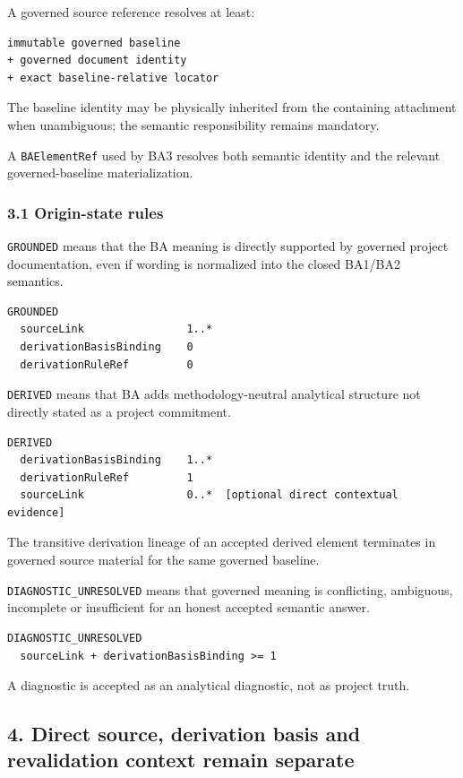 \documentclass[11pt,a4paper]{article}
\begin{document}
A governed source reference resolves at least:

\begin{verbatim}
immutable governed baseline
+ governed document identity
+ exact baseline-relative locator
\end{verbatim}

The baseline identity may be physically inherited from the containing attachment when unambiguous; the semantic responsibility remains mandatory.

A \texttt{BAElementRef} used by BA3 resolves both semantic identity and the relevant governed-baseline materialization.

\subsubsection{3.1 Origin-state rules}\label{origin-state-rules}

\texttt{GROUNDED} means that the BA meaning is directly supported by governed project documentation, even if wording is normalized into the closed BA1/BA2 semantics.

\begin{verbatim}
GROUNDED
  sourceLink                1..*
  derivationBasisBinding    0
  derivationRuleRef         0
\end{verbatim}

\texttt{DERIVED} means that BA adds methodology-neutral analytical structure not directly stated as a project commitment.

\begin{verbatim}
DERIVED
  derivationBasisBinding    1..*
  derivationRuleRef         1
  sourceLink                0..*  [optional direct contextual evidence]
\end{verbatim}

The transitive derivation lineage of an accepted derived element terminates in governed source material for the same governed baseline.

\texttt{DIAGNOSTIC\_UNRESOLVED} means that governed meaning is conflicting, ambiguous, incomplete or insufficient for an honest accepted semantic answer.

\begin{verbatim}
DIAGNOSTIC_UNRESOLVED
  sourceLink + derivationBasisBinding >= 1
\end{verbatim}

A diagnostic is accepted as an analytical diagnostic, not as project truth.

\subsection{4. Direct source, derivation basis and revalidation context remain separate}\label{direct-source-derivation-basis-and-revalidation-context-remain-separate}
\end{document}
